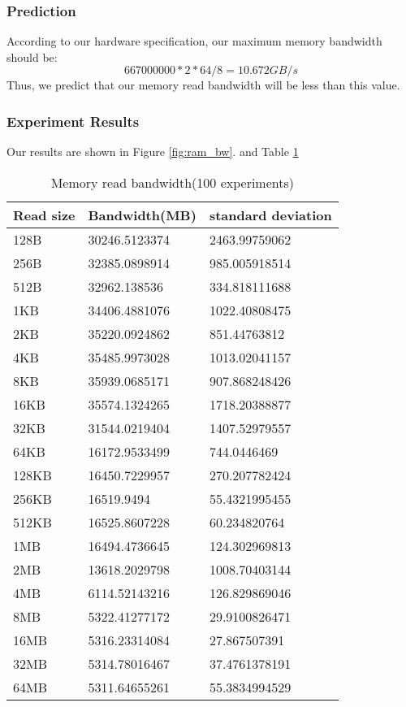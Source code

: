 \documentclass{article} %
\begin{document}
\subsubsection{Prediction}
According to our hardware specification, our maximum memory bandwidth should be:\\
$$ 667000000 * 2 * 64 / 8 = 10.672GB/s $$
Thus, we predict that our memory read bandwidth will be less than this value.\\

\subsubsection{Experiment Results}
Our results are shown in Figure \ref{fig:ram_bw}. and Table \ref{table:mem_bw} \\

\begin{table}
  \begin{center}
    \caption{Memory read bandwidth(100 experiments)}
    \begin{tabular}{|l|l|l|}
      \hline
      Read size& Bandwidth(MB)& standard deviation \\  \hline
      128B  & 30246.5123374 & 2463.99759062 \\  \hline
      256B  & 32385.0898914 & 985.005918514 \\  \hline
      512B  & 32962.138536  & 334.818111688 \\  \hline
      1KB   & 34406.4881076 & 1022.40808475 \\  \hline
      2KB   & 35220.0924862 & 851.44763812 \\  \hline
      4KB   & 35485.9973028 & 1013.02041157 \\  \hline
      8KB   & 35939.0685171 & 907.868248426 \\  \hline
      16KB  & 35574.1324265 & 1718.20388877 \\  \hline
      32KB  & 31544.0219404 & 1407.52979557 \\  \hline
      64KB  & 16172.9533499 & 744.0446469 \\  \hline
      128KB & 16450.7229957 & 270.207782424 \\  \hline
      256KB & 16519.9494    & 55.4321995455 \\  \hline
      512KB & 16525.8607228 & 60.234820764 \\  \hline
      1MB   & 16494.4736645 & 124.302969813 \\  \hline
      2MB   & 13618.2029798 & 1008.70403144 \\  \hline
      4MB   & 6114.52143216 & 126.829869046 \\  \hline
      8MB   & 5322.41277172 & 29.9100826471 \\  \hline
      16MB  & 5316.23314084 & 27.867507391 \\  \hline
      32MB  & 5314.78016467 & 37.4761378191 \\  \hline
      64MB  & 5311.64655261 & 55.3834994529 \\  \hline
    \end{tabular}
    \label{table:mem_bw}
  \end{center}
\end{table}
\end{document}
